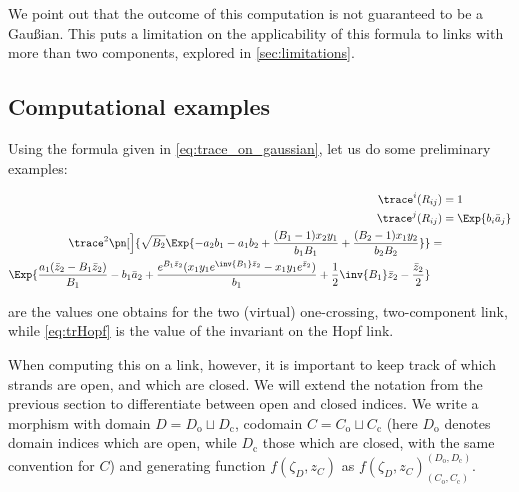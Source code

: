 We point out that the outcome of this computation is not guaranteed to be a
Gaußian. This puts a limitation on the applicability of this formula to links
with more than two components, explored in \cref{sec:limitations}.

\subsection{Computational examples}

Using the formula given in \cref{eq:trace_on_gaussian}, let us do some
preliminary examples:

\begin{align}
        \trace^i(R_{ij}) &= 1\label{eq:trR}\\
        \trace^j(R_{ij}) &= \Exp{b_i\ba_j}\label{eq:trR2}\\
        \begin{split}\label{eq:trHopf}
                \trace^2\pn[\Big]{\sqrt{B_2}\Exp{
                                -a_2 b_1-a_1 b_2 +
                                \frac{(B_1-1) x_2 y_1}{b_1 B_1}+
                        \frac{(B_2-1) x_1 y_2}{b_2 B_2}}
                } &= \\
                \Exp{
                        \frac{a_1 (\bz_2-B_1 \bz_2)}{B_1}-b_1 \ba_2+
                        \frac{e^{B_1 \bz_2}
                        (x_1 y_1 e^{\inv{B_1} \bz_2}-x_1 y_1 e^{\bz_2})}{b_1}+
                        \frac{1}{2} \inv{B_1} \bz_2-\frac{\bz_2}{2}
                }&%
        \end{split}
\end{align}

 are the values one obtains for the two (virtual)
one-crossing, two-component link, while \cref{eq:trHopf} is the value of the
invariant on the Hopf link.

When computing this on a link, however, it is important to keep track of which
strands are open, and which are closed. We will extend the notation from the
previous section to differentiate between open and closed indices. We write a
morphism with domain $D = D_{\text{o}}\sqcup D_{\text{c}}$, codomain
$C = C_{\text{o}}\sqcup C_{\text{c}}$ (here $D_{\text{o}}$ denotes domain
indices which are open, while $D_{\text{c}}$ those which are closed, with the
same convention for $C$) and generating function $f(ζ_{D}, z_{C})$ as
$f(ζ_{D}, z_{C})^{(D_{\text{o}},D_{\text{c}})}_{(C_{\text{o}},C_{\text{c}})}$. 
